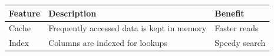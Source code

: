 \begin{table}[htbp]
\centering
\begin{tabularx}{\textwidth}{lXX}
\toprule
Feature & Description & Benefit \\
\midrule
Cache & Frequently accessed data is kept in memory & Faster reads \\
Index & Columns are indexed for lookups & Speedy search \\
\bottomrule
\end{tabularx}
\end{table}

